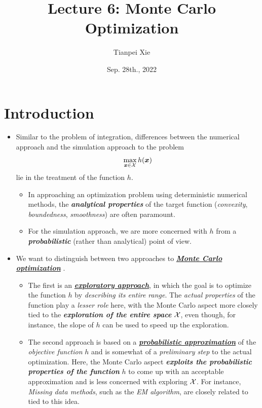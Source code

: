 \documentclass[11pt]{article}
\begin{document}
\title{Lecture 6: Monte Carlo Optimization}
\author{ Tianpei Xie}
\date{Sep. 28th., 2022 }
\maketitle
\tableofcontents
\newpage
\allowdisplaybreaks
\section{Introduction}
\begin{itemize}
\item Similar to the problem of integration, differences between the numerical approach and the simulation approach to the problem
\begin{align}
\max_{\boldsymbol{x}\in {\mathcal X}} h(\boldsymbol{x}) \label{eqn: stochastic_opt}
\end{align} lie in the treatment of the function $h$. 
\begin{itemize}
\item In approaching an optimization problem using deterministic numerical methods, the \emph{\textbf{analytical properties}} of the target function (\emph{convexity}, \emph{boundedness}, \emph{smoothness}) are often paramount.
\item For the simulation approach, we are more concerned with $h$ from a \emph{\textbf{probabilistic}} (rather than analytical) point of view. 
\end{itemize}

\item We want to distinguish between two approaches to \underline{\emph{\textbf{Monte Carlo optimization}}} \citep{robert1999monte}.
\begin{itemize}
\item  The first is an \underline{\emph{\textbf{exploratory approach}}}, in which the goal is to optimize the function $h$ by \emph{describing its entire range}. The \emph{actual properties} of the function play a \emph{lesser role} here, with the Monte Carlo aspect more closely tied to the \emph{\textbf{exploration of the entire space}} ${\mathcal X}$, even though, for instance, the slope of $h$ can be used to speed up the exploration.

\item The second approach is based on a \underline{\emph{\textbf{probabilistic approximation}}} of the \emph{objective function} $h$ and is somewhat of a \emph{preliminary step} to the actual optimization. Here, the Monte Carlo aspect \emph{\textbf{exploits the probabilistic properties of the function}} $h$ to come up with an acceptable approximation and is less concerned with exploring ${\mathcal X}$. For instance, \emph{Missing data methods}, such as the \emph{EM algorithm}, are closely related to tied to this idea.
\end{itemize}
\end{itemize}
\end{document}
